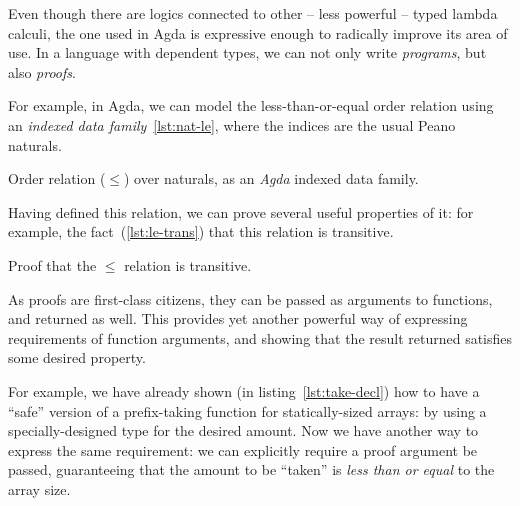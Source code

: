 
            Even though there are logics connected to other -- less powerful -- typed lambda calculi,
            the one used in Agda is expressive enough to radically improve its area of use.
            In a language with dependent types, we can not only write \emph{programs}, but also \emph{proofs}.

            For example, in Agda, we can model the less-than-or-equal order relation using an
            \emph{indexed data family}~\ref{lst:nat-le}, where the indices are the usual Peano naturals.

            \begin{listing}[h]
                \caption{Order relation ($\le$) over naturals, as an \emph{Agda} indexed data family.
                    \label{lst:nat-le}}
            \end{listing}

            Having defined this relation, we can prove several useful properties of it:
            for example, the fact~(\ref{lst:le-trans}) that this relation is transitive.

            \begin{listing}[h]
                \caption{Proof that the $\le$ relation is transitive. \label{lst:le-trans}}
            \end{listing}

            As proofs are first-class citizens, they can be passed as arguments to functions, and
            returned as well.
            This provides yet another powerful way of expressing requirements of function arguments,
            and showing that the result returned satisfies some desired property.

            For example, we have already shown (in listing~\ref{lst:take-decl}) how to have a ``safe''
            version of a prefix-taking function for statically-sized arrays:
            by using a specially-designed type for the desired amount.
            Now we have another way to express the same requirement:
            we can explicitly require a proof argument be passed,
            guaranteeing that the amount to be ``taken'' is \emph{less than or equal} to the array size.

            \begin{listing}[h]
            \end{listing}

